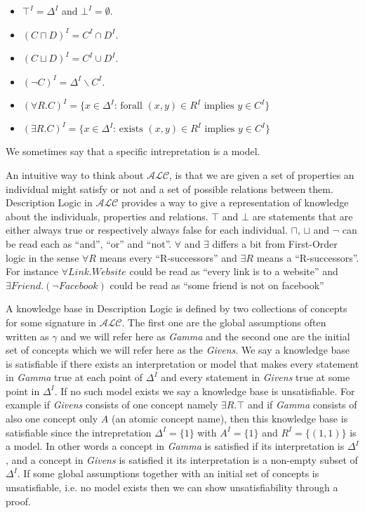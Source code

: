 \begin{itemize}
\item $\top^{I} = \Delta^{I}$ and $\bot^{I} = \emptyset$.
\item $(C \sqcap D)^{I} = C^{I} \cap D^{I}$.
\item $(C \sqcup D)^{I} = C^{I} \cup D^{I}$.
\item $(\neg C)^{I} = \Delta^{I} \backslash C^{I}$.
\item $(\forall R . C)^{I} = \{x \in \Delta^{I} \text{: forall } (x,y) \in R^{I} \text{ implies } y \in C^{I}\}$ 
\item $(\exists R . C)^{I} = \{x \in \Delta^{I} \text{: exists } (x,y) \in R^{I} \text{ implies } y \in C^{I}\}$ 
\end{itemize}

We sometimes say that a specific intrepretation is a model. 

An intuitive way to think about $\mathcal{ALC}$, is that we are given
a set of properties an individual might satisfy or not and a set of
possible relations between them. Description Logic in $\mathcal{ALC}$
provides a way to give a representation of knowledge about the
individuals, properties and relations.  $\top$ and $\bot$ are
statements that are either always true or respectively always false
for each individual.  $\sqcap$, $\sqcup$ and $\neg$ can be read each
as ``and'', ``or'' and ``not''. $\forall$ and $\exists$ differs a bit
from First-Order logic in the sense $\forall R$ means every
``R-successors'' and $\exists R$ means a ``R-successors''. For
instance $\forall Link . Website$ could be read as ``every link is to
a website'' and $\exists Friend . (\neg Facebook)$ could be read as
``some friend is not on facebook''

A knowledge base in Description Logic is defined by two collections of
concepts for some signature in $\mathcal{ALC}$. The first one are the
global assumptions often written as $\gamma$ and we will refer here
as \textit{Gamma} and the second one are the initial set of concepts
which we will refer here as the \textit{Givens}. We say a knowledge
base is satisfiable if there exists an interpretation or model that
makes every statement in \textit{Gamma} true at each point of
$\Delta^{I}$ and every statement in \textit{Givens} true at some point
in $\Delta^{I}$. If no such model exists we say a knowledge base is
unsatisfiable. For example if \textit{Givens} consists of one concept
namely $\exists R. \top$ and if \textit{Gamma} consists of also one
concept only $A$ (an atomic concept name), then this knowledge base is
satisfiable since the intrepretation $\Delta^{I} = \{1\}$ with $A^{I}
= \{1\}$ and $R^{I} = \{(1,1)\}$ is a model. In other words a concept
in \textit{Gamma} is satisfied if its interpretation is $\Delta^{I}$,
and a concept in \textit{Givens} is satisfied it its interpretation is
a non-empty subset of $\Delta^{I}$. If some global assumptions together
with an initial set of concepts is unsatisfiable, i.e. no model exists 
then we can show unsatisfiability through a proof. 
